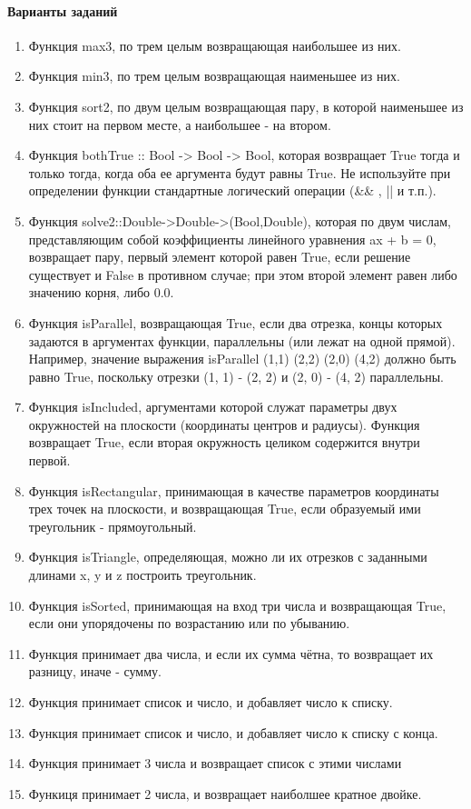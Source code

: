 \documentclass[a4paper,12pt]{article}
\begin{document}
\paragraph{Варианты заданий}
\begin{enumerate}
	\item Функция max3, по трем целым возвращающая наибольшее из них.
	\item Функция min3, по трем целым возвращающая наименьшее из них.
	\item Функция sort2, по двум целым возвращающая пару, в которой наименьшее из них стоит на первом месте, а наибольшее - на втором.
	\item Функция bothTrue :: Bool -> Bool -> Bool, которая возвращает True тогда и только тогда, когда оба ее аргумента будут равны True. Не используйте при определении функции стандартные логический операции  (\&\& , || и т.п.).
	\item Функция     solve2::Double->Double->(Bool,Double), которая по двум числам, представляющим собой коэффициенты линейного уравнения ax + b = 0, возвращает пару, первый    элемент которой равен True, если решение существует и False в противном случае; при этом второй элемент равен либо значению корня, либо 0.0.
	\item Функция isParallel, возвращающая True, если два отрезка, концы которых задаются в аргументах функции, параллельны (или лежат на одной прямой). Например, значение выражения isParallel (1,1) (2,2) (2,0) (4,2) должно быть равно True, поскольку отрезки (1, 1) - (2, 2) и (2, 0) - (4, 2) параллельны.
	\item Функция isIncluded, аргументами которой служат параметры двух окружностей на плоскости (координаты центров и радиусы). Функция возвращает True, если вторая окружность целиком содержится внутри первой.
 	\item Функция isRectangular, принимающая в качестве параметров координаты трех точек на плоскости, и возвращающая True, если образуемый ими треугольник - прямоугольный.
	\item Функция isTriangle, определяющая, можно ли их отрезков с заданными длинами x, y и z построить треугольник.
	\item Функция isSorted, принимающая на вход три числа и возвращающая True, если они упорядочены по возрастанию или по убыванию.
	\item Функция принимает два числа, и если их сумма чётна, то возвращает их разницу, иначе - сумму.
	\item Функция принимает список и число, и добавляет число к списку.
	\item Функция принимает список и число, и добавляет число к списку с конца.
	\item Функция принимает 3 числа и возвращает список с этими числами
	\item Функиця принимает 2 числа, и возвращает наиболшее кратное двойке.
\end{enumerate}
\end{document}
